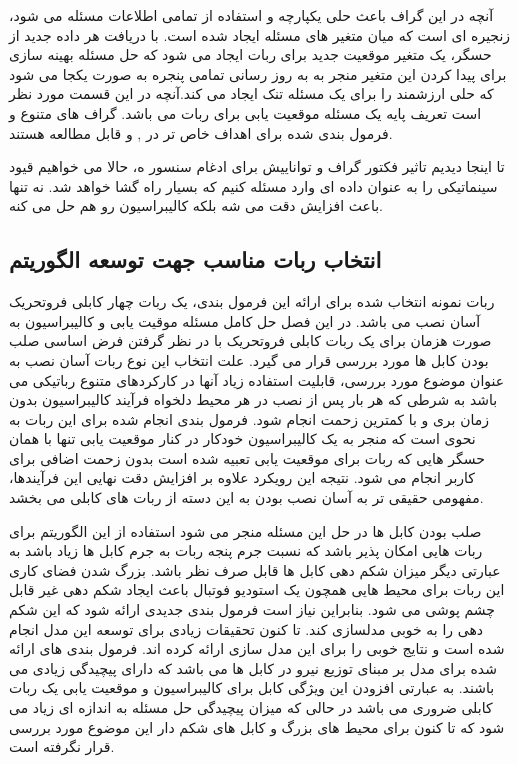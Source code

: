 آنچه در این گراف باعث حلی یکپارچه و استفاده از تمامی اطلاعات مسئله می شود، زنجیره ای است که میان متغیر های مسئله ایجاد شده است. با دریافت هر داده جدید از حسگر، یک متغیر موقعیت جدید برای ربات ایجاد می شود که حل مسئله بهینه سازی برای پیدا کردن این متغیر منجر به به روز رسانی تمامی پنجره به صورت یکجا می شود که حلی ارزشمند را برای یک مسئله تنک ایجاد می کند.آنچه در این قسمت مورد نظر است تعریف پایه یک مسئله موقعیت یابی برای ربات می باشد. گراف های متنوع و فرمول بندی شده برای اهداف خاص تر در 
\cite{yang2022indoor}, 
\cite{song2021tightly}
و 
\cite{leitinger2017factor}
قابل مطالعه هستند. 

تا اینجا دیدیم تاثیر فکتور گراف و تواناییش برای ادغام سنسور ه، حالا می خواهیم قیود سینماتیکی را به عنوان داده ای وارد مسئله کنیم که بسیار راه گشا خواهد شد. نه تنها باعث افزایش دقت می شه بلکه کالیبراسیون رو هم حل می کنه.





\subsection{انتخاب ربات مناسب جهت توسعه  الگوریتم}
ربات نمونه انتخاب شده برای ارائه این فرمول بندی، یک ربات چهار کابلی فروتحریک آسان نصب می باشد. در این فصل حل کامل مسئله موقیت یابی و کالیبراسیون به صورت هزمان برای یک ربات کابلی فروتحریک با در نظر گرفتن فرض اساسی صلب بودن کابل ها مورد بررسی قرار می گیرد. علت انتخاب این نوع ربات آسان نصب به عنوان موضوع مورد بررسی، قابلیت استفاده زیاد آنها در کارکردهای متنوع رباتیکی می باشد به شرطی که هر بار پس از نصب در هر محیط دلخواه فرآیند کالیبراسیون بدون زمان بری و با کمترین زحمت انجام شود. فرمول بندی انجام شده برای این ربات به نحوی است که منجر به یک کالیبراسیون خودکار در کنار موقعیت یابی تنها با همان حسگر هایی که ربات برای موقعیت یابی تعبیه شده است بدون زحمت اضافی برای کاربر انجام می شود. نتیجه این رویکرد علاوه بر افزایش دقت نهایی این فرآیندها، مفهومی حقیقی تر به آسان نصب بودن به این دسته از ربات های کابلی می بخشد. 

صلب بودن کابل ها در حل این مسئله منجر می شود استفاده از این الگوریتم برای ربات هایی امکان پذیر باشد که نسبت جرم پنجه ربات به جرم کابل ها زیاد باشد به عبارتی دیگر میزان شکم دهی کابل ها قابل صرف نظر باشد. بزرگ شدن فضای کاری این ربات برای محیط هایی همچون یک استودیو فوتبال باعث ایجاد شکم دهی غیر قابل چشم پوشی می شود. بنابراین نیاز است فرمول بندی جدیدی ارائه شود که این شکم دهی را به خوبی مدلسازی کند. تا کنون تحقیقات زیادی برای توسعه این مدل انجام شده است و نتایج خوبی را برای این مدل سازی ارائه کرده اند. فرمول بندی های ارائه شده برای مدل بر مبنای توزیع نیرو در کابل ها می باشد که دارای پیچیدگی زیادی می باشند. به عبارتی افزودن این ویژگی کابل برای کالیبراسیون و موقعیت یابی یک ربات کابلی ضروری می باشد در حالی که میزان پیچیدگی حل مسئله به اندازه ای زیاد می شود که تا کنون برای محیط های بزرگ و کابل های شکم دار این موضوع مورد بررسی قرار نگرفته است. 

